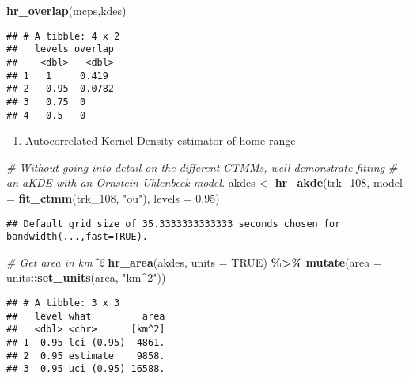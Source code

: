 \documentclass[
]{article}
\newenvironment{Shaded}{\begin{snugshade}}{\end{snugshade}}
\newcommand{\AttributeTok}[1]{\textcolor[rgb]{0.13,0.29,0.53}{#1}}
\newcommand{\CommentTok}[1]{\textcolor[rgb]{0.56,0.35,0.01}{\textit{#1}}}
\newcommand{\ConstantTok}[1]{\textcolor[rgb]{0.56,0.35,0.01}{#1}}
\newcommand{\FloatTok}[1]{\textcolor[rgb]{0.00,0.00,0.81}{#1}}
\newcommand{\FunctionTok}[1]{\textcolor[rgb]{0.13,0.29,0.53}{\textbf{#1}}}
\newcommand{\NormalTok}[1]{#1}
\newcommand{\OtherTok}[1]{\textcolor[rgb]{0.56,0.35,0.01}{#1}}
\newcommand{\SpecialCharTok}[1]{\textcolor[rgb]{0.81,0.36,0.00}{\textbf{#1}}}
\newcommand{\StringTok}[1]{\textcolor[rgb]{0.31,0.60,0.02}{#1}}
\providecommand{\tightlist}{%
  \setlength{\itemsep}{0pt}\setlength{\parskip}{0pt}}
\begin{document}
\begin{Shaded}
\begin{Highlighting}[]
\FunctionTok{hr\_overlap}\NormalTok{(mcps,kdes)}
\end{Highlighting}
\end{Shaded}

\begin{verbatim}
## # A tibble: 4 x 2
##   levels overlap
##    <dbl>   <dbl>
## 1   1     0.419 
## 2   0.95  0.0782
## 3   0.75  0     
## 4   0.5   0
\end{verbatim}

\begin{enumerate}
\def\labelenumi{\alph{enumi}.}
\setcounter{enumi}{2}
\tightlist
\item
  Autocorrelated Kernel Density estimator of home range
\end{enumerate}

\begin{Shaded}
\begin{Highlighting}[]
\CommentTok{\# Without going into detail on the different CTMMs, we\textquotesingle{}ll demonstrate fitting}
\CommentTok{\# an aKDE with an Ornstein{-}Uhlenbeck model.}
\NormalTok{akdes }\OtherTok{\textless{}{-}} \FunctionTok{hr\_akde}\NormalTok{(trk\_108, }\AttributeTok{model =} \FunctionTok{fit\_ctmm}\NormalTok{(trk\_108, }\StringTok{"ou"}\NormalTok{), }\AttributeTok{levels =} \FloatTok{0.95}\NormalTok{)}
\end{Highlighting}
\end{Shaded}

\begin{verbatim}
## Default grid size of 35.3333333333333 seconds chosen for bandwidth(...,fast=TRUE).
\end{verbatim}

\begin{Shaded}
\begin{Highlighting}[]
\CommentTok{\# Get area in km\^{}2}
\FunctionTok{hr\_area}\NormalTok{(akdes, }\AttributeTok{units =} \ConstantTok{TRUE}\NormalTok{) }\SpecialCharTok{\%\textgreater{}\%} 
  \FunctionTok{mutate}\NormalTok{(}\AttributeTok{area =}\NormalTok{ units}\SpecialCharTok{::}\FunctionTok{set\_units}\NormalTok{(area, }\StringTok{"km\^{}2"}\NormalTok{))}
\end{Highlighting}
\end{Shaded}

\begin{verbatim}
## # A tibble: 3 x 3
##   level what         area
##   <dbl> <chr>      [km^2]
## 1  0.95 lci (0.95)  4861.
## 2  0.95 estimate    9858.
## 3  0.95 uci (0.95) 16588.
\end{verbatim}
\end{document}
